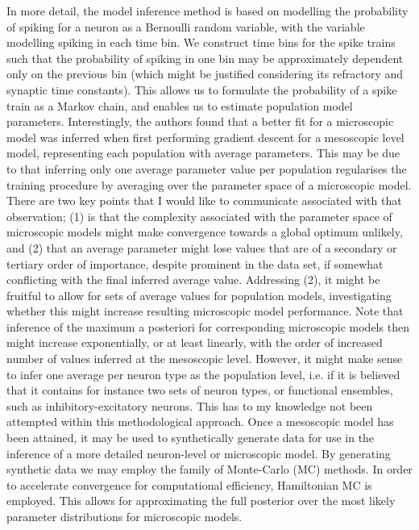 \documentclass[mphil,deptreport,ai]{infthesis} %
\begin{document}
In more detail, the model inference method is based on modelling the probability of spiking for a neuron as a Bernoulli random variable, with the variable modelling spiking in each time bin. We construct time bins for the spike trains such that the probability of spiking in one bin may be approximately dependent only on the previous bin (which might be justified considering its refractory and synaptic time constants). This allows us to formulate the probability of a spike train as a Markov chain, and enables us to estimate population model parameters. Interestingly, the authors found that a better fit for a microscopic model was inferred when first performing gradient descent for a mesoscopic level model, representing each population with average parameters. 
This may be due to that inferring only one average parameter value per population regularises the training procedure by averaging over the parameter space of a microscopic model. 
There are two key points that I would like to communicate associated with that observation; (1) is that the complexity associated with the parameter space of microscopic models might make convergence towards a global optimum unlikely, and (2) that an average parameter might lose values that are of a secondary or tertiary order of importance, despite prominent in the data set, if somewhat conflicting with the final inferred average value. Addressing (2), it might be fruitful to allow for sets of average values for population models, investigating whether this might increase resulting microscopic model performance. Note that inference of the maximum a posteriori for corresponding microscopic models then might increase exponentially, or at least linearly, with the order of increased number of values inferred at the mesoscopic level. However, it might make sense to infer one average per neuron type as the population level, i.e. if it is believed that it contains for instance two sets of neuron types, or functional ensembles, such as inhibitory-excitatory neurons. This has to my knowledge not been attempted within this methodological approach.
Once a mesoscopic model has been attained, it may be used to synthetically generate data for use in the inference of a more detailed neuron-level or microscopic model. By generating synthetic data we may employ the family of Monte-Carlo (MC) methods. In order to accelerate convergence for computational efficiency, Hamiltonian MC is employed. This allows for approximating the full posterior over the most likely parameter distributions for microscopic models.
\end{document}
